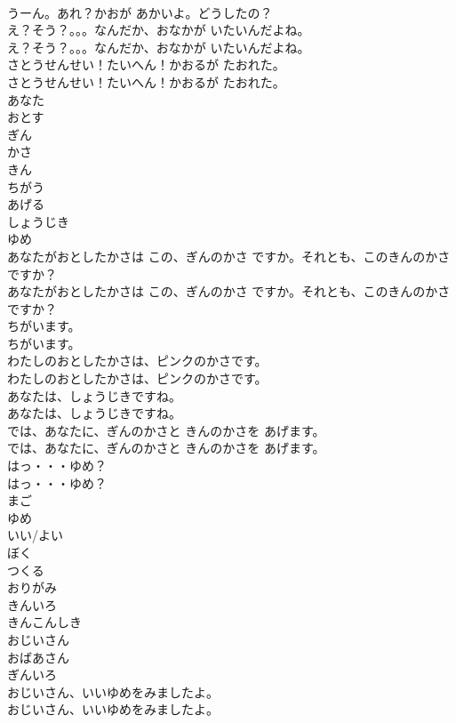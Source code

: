 \documentclass[8pt]{extreport}
\begin{document}
\begin{CJK}{UTF8}{min}
\\	うーん。あれ？かおが あかいよ。どうしたの？ 
\\	え？そう？。。。なんだか、おなかが いたいんだよね。	
\\	え？そう？。。。なんだか、おなかが いたいんだよね。 
\\	さとうせんせい！たいへん！かおるが たおれた。	
\\	さとうせんせい！たいへん！かおるが たおれた。 
\\	あなた
\\	おとす
\\	ぎん
\\	かさ
\\	きん
\\	ちがう
\\	あげる
\\	しょうじき
\\	ゆめ
\\	あなたがおとしたかさは この、ぎんのかさ ですか。それとも、このきんのかさ ですか？	
\\	あなたがおとしたかさは この、ぎんのかさ ですか。それとも、このきんのかさ ですか？ 
\\	ちがいます。	
\\	ちがいます。 
\\	わたしのおとしたかさは、ピンクのかさです。	
\\	わたしのおとしたかさは、ピンクのかさです。 
\\	あなたは、しょうじきですね。	
\\	あなたは、しょうじきですね。 
\\	では、あなたに、ぎんのかさと きんのかさを あげます。	
\\	では、あなたに、ぎんのかさと きんのかさを あげます。 
\\	はっ・・・ゆめ？	
\\	はっ・・・ゆめ？ 
\\	まご
\\	ゆめ
\\	いい/よい
\\	ぼく
\\	つくる
\\	おりがみ
\\	きんいろ
\\	きんこんしき
\\	おじいさん
\\	おばあさん
\\	ぎんいろ
\\	おじいさん、いいゆめをみましたよ。	
\\	おじいさん、いいゆめをみましたよ。 

\end{CJK}
\end{document}
